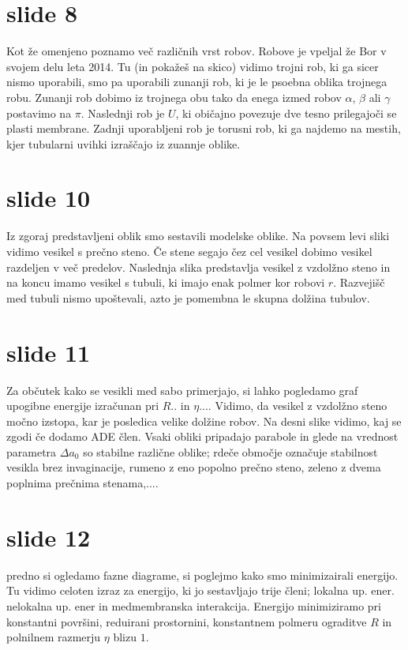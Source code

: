 \documentclass[openany, longbibliography,slovene,a4paper,12pt]{book}
\begin{document}
\section{slide 8}
Kot že omenjeno poznamo več različnih vrst robov. Robove je vpeljal že Bor v svojem delu leta 2014. Tu (in pokažeš na skico) vidimo trojni rob, ki ga sicer nismo uporabili, smo pa uporabili zunanji rob, ki je le psoebna oblika trojnega robu. Zunanji rob dobimo iz trojnega obu tako da enega izmed robov $\alpha$, $\beta$ ali $\gamma$ postavimo na $\pi$. Naslednji rob je $U$, ki običajno povezuje dve tesno prilegajoči se plasti membrane. Zadnji uporabljeni rob je torusni rob, ki ga najdemo na mestih, kjer tubularni uvihki izraščajo iz zuannje oblike.

\section{slide 10}
Iz zgoraj predstavljeni oblik smo sestavili modelske oblike. Na povsem levi sliki vidimo vesikel s prečno steno. Če stene segajo čez cel vesikel dobimo vesikel razdeljen v več predelov.  Naslednja slika predstavlja vesikel z vzdolžno steno in na koncu imamo vesikel s tubuli, ki imajo enak polmer kor robovi $r$. Razvejišč med tubuli nismo upoštevali, azto je pomembna le skupna dolžina tubulov.

\section{slide 11}
Za občutek kako se vesikli med sabo primerjajo, si lahko pogledamo graf upogibne energije izračunan pri $R..$ in $\eta...$. Vidimo, da vesikel z vzdolžno steno močno izstopa, kar je posledica velike dolžine robov. Na desni slike vidimo, kaj se zgodi če dodamo ADE člen. Vsaki obliki pripadajo parabole in glede na vrednost parametra $\Delta a_0$ so stabilne različne oblike; rdeče območje označuje stabilnost vesikla brez invaginacije, rumeno z eno popolno prečno steno, zeleno z dvema poplnima prečnima stenama,....

\section{slide 12}
predno si ogledamo fazne diagrame, si poglejmo kako smo minimizairali energijo. Tu vidimo celoten izraz za energijo, ki jo sestavljajo trije členi; lokalna up. ener. nelokalna up. ener in medmembranska interakcija. Energijo minimiziramo pri konstantni površini, reduirani prostornini, konstantnem polmeru ograditve $R$ in polnilnem razmerju $\eta$ blizu $1$.
\end{document}
